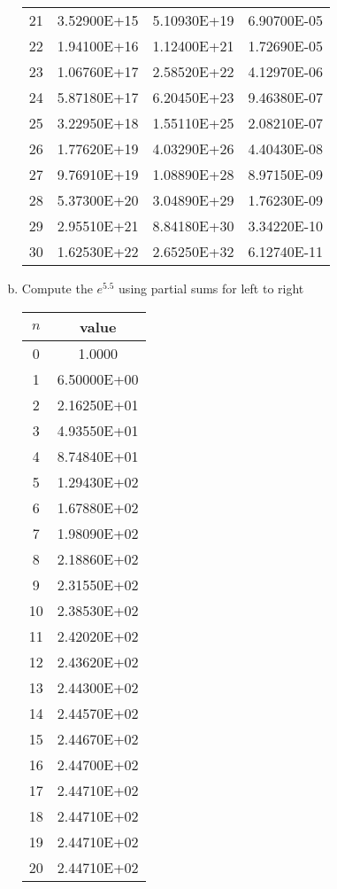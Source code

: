 \begin{enumerate}[(a)]
\begin{table}[H]
\begin{tabular}{c|c|c|c}
					21 & 3.52900E+15 & 5.10930E+19 & 6.90700E-05\\
					22 & 1.94100E+16 & 1.12400E+21 & 1.72690E-05\\
					23 & 1.06760E+17 & 2.58520E+22 & 4.12970E-06\\
					24 & 5.87180E+17 & 6.20450E+23 & 9.46380E-07\\
					25 & 3.22950E+18 & 1.55110E+25 & 2.08210E-07\\
					26 & 1.77620E+19 & 4.03290E+26 & 4.40430E-08\\
					27 & 9.76910E+19 & 1.08890E+28 & 8.97150E-09\\
					28 & 5.37300E+20 & 3.04890E+29 & 1.76230E-09\\
					29 & 2.95510E+21 & 8.84180E+30 & 3.34220E-10 \\
					30 & 1.62530E+22 & 2.65250E+32 & 6.12740E-11
				\end{tabular}
			\end{table}
	\item Compute the $e^{5.5}$ using partial sums for left to right
			\begin{table}[H]
			\centering
				\begin{tabular}{c|c}
					$n$ & value \\
					\hline
					0 & 1.0000\\
					1 & 6.50000E+00 \\
					2 & 2.16250E+01 \\
					3 & 4.93550E+01 \\
					4 & 8.74840E+01 \\
					5 & 1.29430E+02 \\
					6 & 1.67880E+02 \\
					7 & 1.98090E+02 \\
					8 & 2.18860E+02 \\
					9 & 2.31550E+02 \\
					10 & 2.38530E+02 \\
					11 & 2.42020E+02 \\
					12 & 2.43620E+02 \\
					13 & 2.44300E+02 \\
					14 & 2.44570E+02 \\
					15 & 2.44670E+02 \\
					16 & 2.44700E+02 \\
					17 & 2.44710E+02 \\
					18 & 2.44710E+02 \\
					19 & 2.44710E+02 \\
					20 & 2.44710E+02 \\

\end{tabular}
\end{table}
\end{enumerate}
